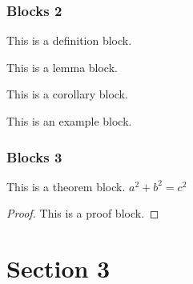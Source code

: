 \documentclass[compress,aspectratio=43]{beamer}
\begin{document}
\begin{frame}
    \frametitle{Blocks 2}
    \begin{definition}[XXX]
        This is a definition block.
    \end{definition}

    \begin{lemma}[XXX]
        This is a lemma block.
    \end{lemma}

    \begin{corollary}[XXX]
        This is a corollary block.
    \end{corollary}

    \begin{example}[XXX]
        This is an example block.
    \end{example}

\end{frame}

\begin{frame}
    \frametitle{Blocks 3}
    \begin{theorem}[XXX]
        This is a theorem block. $a^2 + b^2 = c^2$
    \end{theorem}

    \begin{proof}
        This is a proof block.
    \end{proof}

\end{frame}



\section{Section 3}
\end{document}
